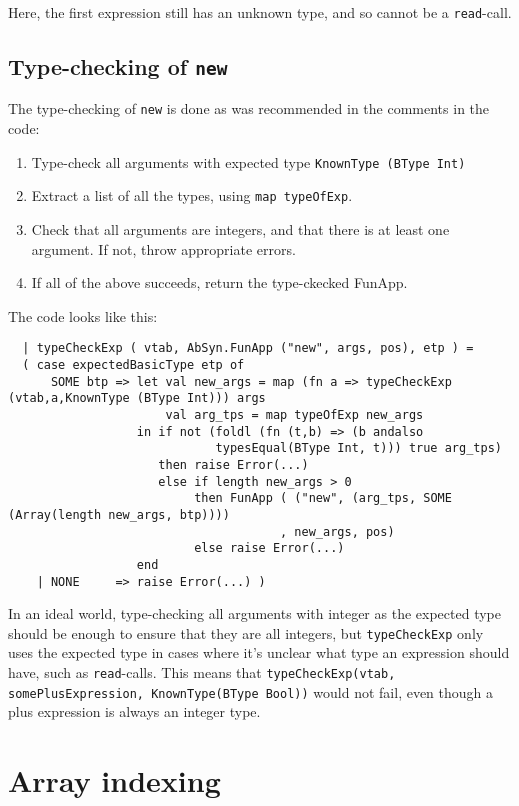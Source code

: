 \documentclass{article}
\begin{document}
Here, the first expression still has an unknown type, and so cannot be a \texttt{read}-call.

\subsection{Type-checking of \texttt{new}}
The type-checking of \texttt{new} is done as was recommended in the comments in the code:

\begin{enumerate}
    \item Type-check all arguments with expected type \texttt{KnownType (BType Int)}
    \item Extract a list of all the types, using \texttt{map typeOfExp}.
    \item Check that all arguments are integers, and that there is at least one argument. If not, throw appropriate errors.
    \item If all of the above succeeds, return the type-ckecked FunApp.
\end{enumerate}

The code looks like this:
\begin{lstlisting}
  | typeCheckExp ( vtab, AbSyn.FunApp ("new", args, pos), etp ) =
  ( case expectedBasicType etp of
      SOME btp => let val new_args = map (fn a => typeCheckExp (vtab,a,KnownType (BType Int))) args
                      val arg_tps = map typeOfExp new_args
                  in if not (foldl (fn (t,b) => (b andalso
                             typesEqual(BType Int, t))) true arg_tps)
                     then raise Error(...)
                     else if length new_args > 0
                          then FunApp ( ("new", (arg_tps, SOME (Array(length new_args, btp))))
                                      , new_args, pos)
                          else raise Error(...)
                  end
    | NONE     => raise Error(...) )
\end{lstlisting}

In an ideal world, type-checking all arguments with integer as the expected type should be enough to ensure that they are all integers, but \texttt{typeCheckExp} only uses the expected type in cases where it's unclear what type an expression should have, such as \texttt{read}-calls. This means that \texttt{typeCheckExp(vtab, somePlusExpression, KnownType(BType Bool))} would not fail, even though a plus expression is always an integer type.

\section{Array indexing}
\end{document}
